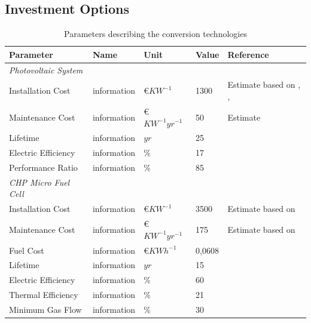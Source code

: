 \documentclass[
	11pt,								%
	DIV10,								%
	a4paper,         					%
	oneside,							%
	headheight=20pt,					%
	footheight=20pt,					%
    parskip=full,						%
    listof=totoc,						%
	bibliography=totoc,					%
	index=totoc,						%
]{scrartcl}
\begin{document}
\subsection{Investment Options}
\begin{table}[H]
	\centering
	\caption{Parameters describing the conversion technologies}
	\begin{tabular}{lllll}
		\hline
		\textbf{Parameter}			& \textbf{Name}			& \textbf{Unit}			& \textbf{Value}	&\textbf{Reference}     \\ \hline
		\textit{Photovoltaic System} & & & &\\
		Installation Cost           & information     		& \euro $KW^{-1}$  		& 1300				& Estimate based on \cite{wirthAktuelleFaktenZur2018}, \cite{SolarmoduleEBay2018}, \cite{ModulePriceIndex2018}   \\
		Maintenance Cost            & information     		& \euro $KW^{-1}yr^{-1}$& 50				& Estimate \\
		Lifetime                    & information     		& $yr$  				& 25 				& \cite{wirthAktuelleFaktenZur2018}   \\
		Electric Efficiency         & information     		& $\%$  				& 17				& \cite{wirthAktuelleFaktenZur2018}   \\
		Performance Ratio           & information     		& $\%$  				& 85				& \cite{wirthAktuelleFaktenZur2018}   \\
		\textit{CHP Micro Fuel Cell} & & & &\\
		Installation Cost           & information     		& \euro $KW^{-1}$  		& 3500 				& Estimate based on \cite{LAUINGER201624}    \\
		Maintenance Cost            & information     		& \euro $KW^{-1}yr^{-1}$& 175				& Estimate based on \cite{LAUINGER201624}   \\
		Fuel	 Cost           			& information     		& \euro $KWh^{-1}$   	& 0,0608			& \cite{NaturalGasPrices2018}   \\
		Lifetime                    & information     		& $yr$  				& 15 				& \cite{LAUINGER201624}    \\
		Electric Efficiency         & information     		& $\%$  				& 60				& \cite{BlueGENWorldsMost2018}   \\
		Thermal Efficiency			& information     		& $\%$  				& 21				& \cite{BlueGENWorldsMost2018}   \\
		Minimum Gas Flow    			& information     		& $\%$ 		 			& 30				& \cite{LAUINGER201624}   \\
		\hline
	\end{tabular}
\end{table}
\end{document}

